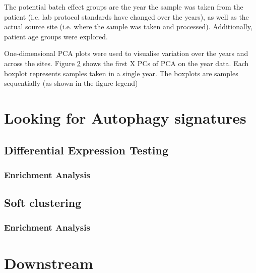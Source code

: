     The potential batch effect groups are the year the sample was taken from the patient (i.e. lab protocol standards have changed over the years), as well as the actual source site (i.e. where the sample was taken and processed). Additionally, patient age groups were explored. 
    
    One-dimensional PCA plots were used to visualise variation over the years and across the sites. 
    Figure \ref{} shows the first X PCs of PCA on the year data. Each boxplot represents samples taken in a single year. The boxplots are samples sequentially (as shown in the figure legend)
    
    
    
    
    


\section{Looking for Autophagy signatures}

    \subsection{Differential Expression Testing}
    
        \subsubsection{Enrichment Analysis}

    \subsection{Soft clustering}
    
        \subsubsection{Enrichment Analysis}
    
\section{Downstream}

